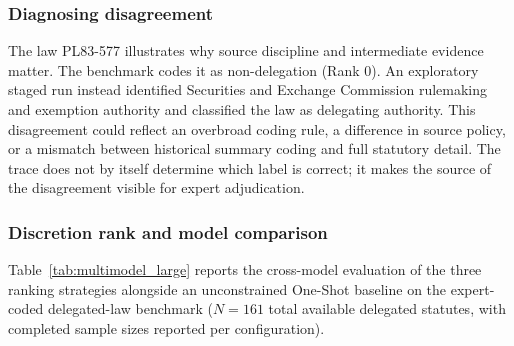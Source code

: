 \documentclass[runningheads]{llncs}
\begin{document}
\subsubsection{Diagnosing disagreement}

The law PL83-577 illustrates why source discipline and intermediate evidence matter. The benchmark codes it as non-delegation (Rank 0). An exploratory staged run instead identified Securities and Exchange Commission rulemaking and exemption authority and classified the law as delegating authority. This disagreement could reflect an overbroad coding rule, a difference in source policy, or a mismatch between historical summary coding and full statutory detail. The trace does not by itself determine which label is correct; it makes the source of the disagreement visible for expert adjudication.

\vspace{-0.5cm}
\subsubsection{Discretion rank and model comparison}
Table~\ref{tab:multimodel_large} reports the cross-model evaluation of the three ranking strategies alongside an unconstrained One-Shot baseline on the expert-coded delegated-law benchmark ($N=161$ total available delegated statutes, with completed sample sizes reported per configuration).
\end{document}

